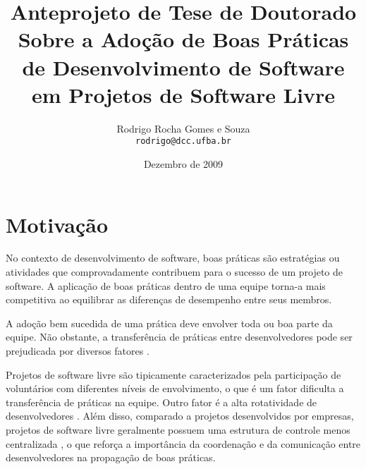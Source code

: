 \documentclass{article}
\title{
{\small Anteprojeto de Tese de Doutorado} \\
Sobre a Adoção de Boas Práticas 
de Desenvolvimento de Software 
em Projetos de Software Livre}
\author{Rodrigo Rocha Gomes e Souza\\
\texttt{rodrigo@dcc.ufba.br}}
\date{Dezembro de 2009}
\begin{document}
\sloppy
\maketitle








\section{Motivação} %

No contexto de desenvolvimento de software, boas práticas são estratégias ou
atividades que comprovadamente contribuem para o sucesso de um projeto de
software. A aplicação de boas práticas dentro de uma equipe torna-a mais
competitiva ao equilibrar as diferenças de desempenho entre seus membros. 

A adoção bem sucedida de uma prática deve envolver toda ou boa parte da equipe.
Não obstante, a transferência de práticas entre desenvolvedores pode ser
prejudicada por diversos fatores \cite{szulanski1996}.

Projetos de software livre são tipicamente caracterizados pela participação de
voluntários com diferentes níveis de envolvimento, o que é um fator dificulta a
transferência de práticas na equipe. Outro fator é a alta rotatividade de
desenvolvedores \cite{robles2006}. Além disso, comparado a projetos
desenvolvidos por empresas, projetos de software livre geralmente possuem uma
estrutura de controle menos centralizada \cite{raymond2001}, o que reforça a
importância da coordenação e da comunicação entre desenvolvedores na propagação
de boas práticas.
\end{document}
